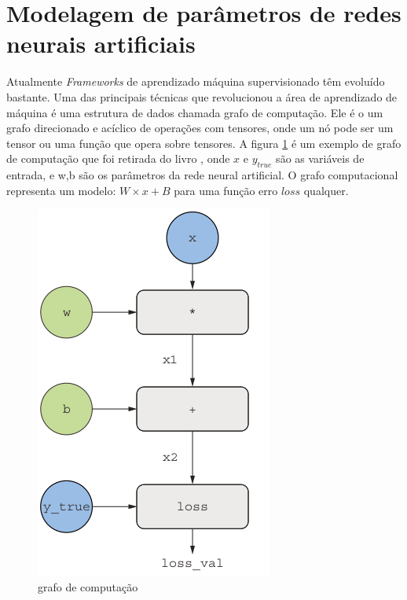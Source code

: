 \section{Modelagem de parâmetros de redes neurais artificiais}
Atualmente \textit{Frameworks} de aprendizado máquina supervisionado
têm evoluído bastante. Uma das principais técnicas que revolucionou a
área de aprendizado de máquina é uma estrutura de dados chamada grafo
de computação. Ele é o um grafo direcionado e acíclico de operações com
tensores, onde um nó pode ser um tensor ou uma função que opera sobre
tensores. A figura \ref{fig:grafo:computacional} é um exemplo de
grafo de computação que foi retirada do livro \cite{chollet2021deep},
onde $x$ e $y_{true}$ são as variáveis de entrada, e w,b são
os parâmetros da rede neural artificial. O grafo computacional
representa um modelo: $W \times x + B$ para uma função erro $loss$ qualquer.

\begin{figure}[H]
    \label{fig:grafo:computacional}
    \centering
    \includegraphics[scale=0.5]{figuras/grafo_computacional.png}
    \caption{grafo de computação}
\end{figure}

